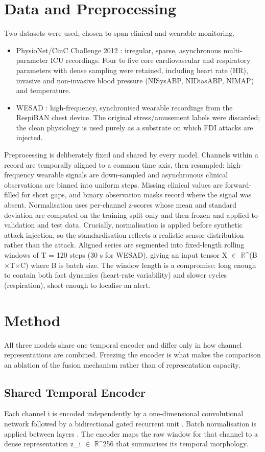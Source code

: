 \documentclass[conference]{IEEEtran}
\begin{document}
\section{Data and Preprocessing}
Two datasets were used, chosen to span clinical and wearable monitoring.
\begin{itemize}
\item PhysioNet/CinC Challenge 2012 \cite{silva2012}: irregular, sparse, asynchronous multi-parameter ICU recordings. Four to five core cardiovascular and respiratory parameters with dense sampling were retained, including heart rate (HR), invasive and non-invasive blood pressure (NISysABP, NIDiasABP, NIMAP) and temperature.
\item WESAD \cite{schmidt2018}: high-frequency, synchronised wearable recordings from the RespiBAN chest device. The original stress/amusement labels were discarded; the clean physiology is used purely as a substrate on which FDI attacks are injected.
\end{itemize}
Preprocessing is deliberately fixed and shared by every model. Channels within a record are temporally aligned to a common time axis, then resampled: high-frequency wearable signals are down-sampled and asynchronous clinical observations are binned into uniform steps. Missing clinical values are forward-filled for short gaps, and binary observation masks record where the signal was absent. Normalisation uses per-channel z-scores whose mean and standard deviation are computed on the training split only and then frozen and applied to validation and test data. Crucially, normalisation is applied before synthetic attack injection, so the standardisation reflects a realistic sensor distribution rather than the attack.
Aligned series are segmented into fixed-length rolling windows of T = 120 steps (30 s for WESAD), giving an input tensor X $\in$ $\mathbb{R}$^(B$\times$T$\times$C) where B is batch size. The window length is a compromise: long enough to contain both fast dynamics (heart-rate variability) and slower cycles (respiration), short enough to localise an alert.
\section{Method}
All three models share one temporal encoder and differ only in how channel representations are combined. Freezing the encoder is what makes the comparison an ablation of the fusion mechanism rather than of representation capacity.
\subsection{Shared Temporal Encoder}
Each channel i is encoded independently by a one-dimensional convolutional network followed by a bidirectional gated recurrent unit \cite{cho2014}. Batch normalisation is applied between layers \cite{ioffe2015}. The encoder maps the raw window for that channel to a dense representation z\_i $\in$ $\mathbb{R}$^256 that summarises its temporal morphology.
\end{document}
